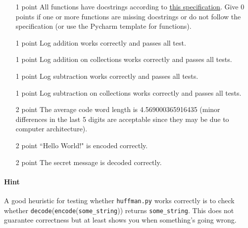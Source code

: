 \documentclass[11pt, leqno, a4paper]{article}
\begin{document}
\begin{itemize}
\item[1 point] All functions have docstrings according to \href{https://www.python.org/dev/peps/pep-0257/}{this specification}. Give 0 points if one or more
functions are missing docstrings or do not follow the specification (or use the Pycharm template for functions).
\item[1 point] Log addition works correctly and passes all test.
\item[1 point] Log addition on collections works correctly and passes all tests.
\item[1 point] Log subtraction works correctly and passes all tests.
\item[1 point] Log subtraction on collections works correctly and passes all tests.
\item[2 point] The average code word length is 4.569000365916435 (minor differences in the last 5 digits are acceptable since they may be due to computer
architecture).
\item[2 point] ``Hello World!" is encoded correctly.
\item[2 point] The secret message is decoded correctly.
\end{itemize}
\paragraph{Hint} A good heuristic for testing whether \texttt{huffman.py} works correctly is to check whether \texttt{decode}(\texttt{encode}(\texttt{some\_string}))
returns \texttt{some\_string}. This does not guarantee correctness but at least shows you when something's going wrong.
\end{document}
